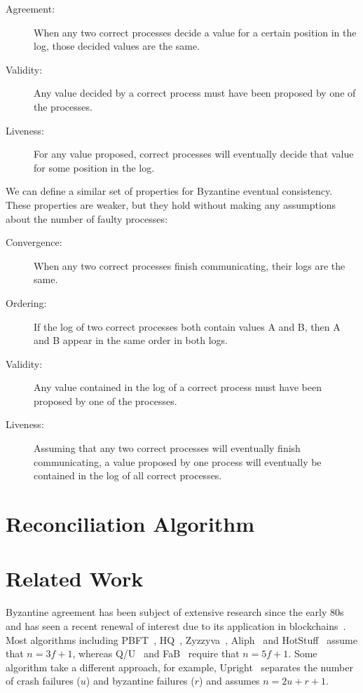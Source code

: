 \documentclass[manuscript]{acmart}
\begin{document}
\begin{description}
\item[Agreement:] When any two correct processes decide a value for a certain position in the log, those decided values are the same.
\item[Validity:] Any value decided by a correct process must have been proposed by one of the processes.
\item[Liveness:] For any value proposed, correct processes will eventually decide that value for some position in the log.
\end{description}

We can define a similar set of properties for Byzantine eventual consistency.
These properties are weaker, but they hold without making any assumptions about the number of faulty processes:

\begin{description}
\item[Convergence:] When any two correct processes finish communicating, their logs are the same.
\item[Ordering:] If the log of two correct processes both contain values A and B, then A and B appear in the same order in both logs.
\item[Validity:] Any value contained in the log of a correct process must have been proposed by one of the processes.
\item[Liveness:] Assuming that any two correct processes will eventually finish communicating, a value proposed by one process will eventually be contained in the log of all correct processes.
\end{description}

\section{Reconciliation Algorithm}

\section{Related Work}

Byzantine agreement has been subject of extensive research since the early 80s~\cite{Lamport:1982} and has seen a recent renewal of interest due to its application in blockchains~\cite{Bano:2019}.
Most algorithms including PBFT~\cite{Castro:1999}, HQ~\cite{Cowling:2006}, Zyzzyva~\cite{Kotla:2007}, Aliph~\cite{Aublin:2015} and HotStuff~\cite{Yin:2019} assume that $n=3f+1$, whereas Q/U~\cite{Abd:2005} and FaB~\cite{Martin:2006} require that $n=5f+1$.
Some algorithm take a different approach, for example, Upright~\cite{Clement:2009} separates the number of crash failures ($u$) and byzantine failures ($r$) and assumes $n=2u+r+1$.
\end{document}
